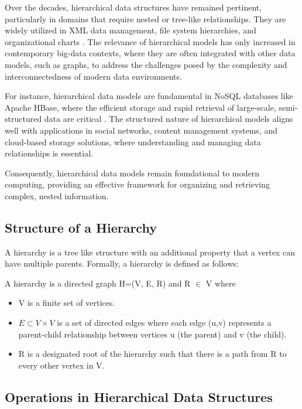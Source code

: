 Over the decades, hierarchical data structures have remained pertinent, particularly in domains that require nested or tree-like relationships. They are widely utilized in XML data management, file system hierarchies, and organizational charts \cite{DBLP:books/mk/BunemanSA99}. The relevance of hierarchical models has only increased in contemporary big-data contexts, where they are often integrated with other data models, such as graphs, to address the challenges posed by the complexity and interconnectedness of modern data environments.

For instance, hierarchical data models are fundamental in NoSQL databases like Apache HBase, where the efficient storage and rapid retrieval of large-scale, semi-structured data are critical \cite{DBLP:books/daglib/0027893}. The structured nature of hierarchical models aligns well with applications in social networks, content management systems, and cloud-based storage solutions, where understanding and managing data relationships is essential.

Consequently, hierarchical data models remain foundational to modern computing, providing an effective framework for organizing and retrieving complex, nested information.

\subsection{Structure of a Hierarchy}
A hierarchy is a tree like structure with an additional property that a vertex can have multiple parents.
Formally, a hierarchy is defined as follows:

\begin{definition}
    A hierarchy is a directed graph H=(V, E, R) and R $\in$ V where
    \begin{itemize}
        \item V is a finite set of vertices.
        \item $E \subset V \times V$ is a set of directed edges where each edge (u,v) represents a parent-child relationship between vertices u (the parent) and v (the child).
        \item R is a designated root of the hierarchy such that there is a path from R to every other vertex in V.
        
    \end{itemize} 
\end{definition}



\subsection{Operations in Hierarchical Data Structures}

